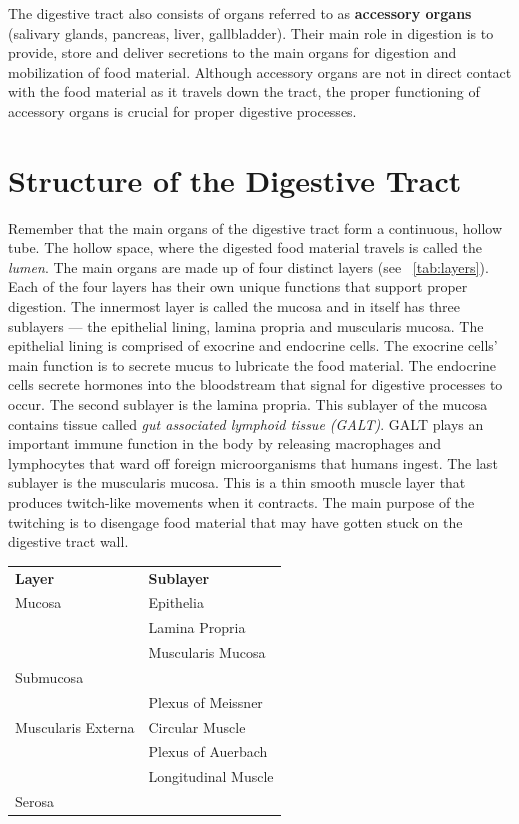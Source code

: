 \documentclass{tufte-handout}
\begin{document}
The digestive tract also consists of organs referred to as \textbf{accessory organs} (salivary glands, pancreas, liver, gallbladder). Their main role in digestion is to provide, store and deliver secretions to the main organs for digestion and mobilization of food material. Although accessory organs are not in direct contact with the food material as it travels down the tract, the proper functioning of accessory organs is crucial for proper digestive processes. 

\section{Structure of the Digestive Tract}

Remember that the main organs of the digestive tract form a continuous, hollow tube. The hollow space, where the digested food material travels is called the \emph{lumen}. The main organs are made up of four distinct layers (see ~\ref{tab:layers}). Each of the four layers has their own unique functions that support proper digestion. The innermost layer is called the mucosa and in itself has three sublayers --- the epithelial lining, lamina propria and muscularis mucosa. The epithelial lining is comprised of exocrine and endocrine cells. The exocrine cells' main function is to secrete mucus to lubricate the food material. The endocrine cells secrete hormones into the bloodstream that signal for digestive processes to occur. The second sublayer is the lamina propria. This sublayer of the mucosa contains tissue called \emph{gut associated lymphoid tissue (GALT)}. GALT plays an important immune function in the body by releasing macrophages and lymphocytes that ward off foreign microorganisms that humans ingest. The last sublayer is the muscularis mucosa. This is a thin smooth muscle layer that produces twitch-like movements when it contracts. The main purpose of the twitching is to disengage food material that may have gotten stuck on the digestive tract wall.

\begin{margintable}
\caption{Layers of the digestive tract.}\label{tab:layers}
\begin{tabular}{ll}
\textbf{Layer} & \textbf{Sublayer} \\
Mucosa & Epithelia \\
       & Lamina Propria \\
       & Muscularis Mucosa \\
Submucosa &  \\
       & Plexus of Meissner \\
Muscularis Externa & Circular Muscle \\
         & Plexus of Auerbach \\
       & Longitudinal Muscle \\    
Serosa & \\             
\end{tabular}
\end{margintable}
\end{document}
